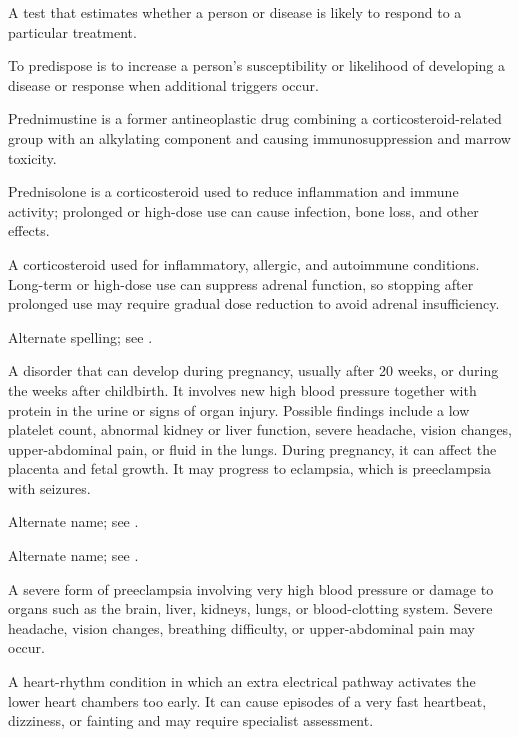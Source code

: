  A test that estimates whether a person or disease is likely to respond to a particular treatment.

 To predispose is to increase a person’s susceptibility or likelihood of developing a disease or response when additional triggers occur.

 Prednimustine is a former antineoplastic drug combining a corticosteroid-related group with an alkylating component and causing immunosuppression and marrow toxicity.

 Prednisolone is a corticosteroid used to reduce inflammation and immune activity; prolonged or high-dose use can cause infection, bone loss, and other effects.

 A corticosteroid used for inflammatory, allergic, and autoimmune conditions. Long-term or high-dose use can suppress adrenal function, so stopping after prolonged use may require gradual dose reduction to avoid adrenal insufficiency.

 Alternate spelling; see .

 A disorder that can develop during pregnancy, usually after 20 weeks, or during the weeks after childbirth. It involves new high blood pressure together with protein in the urine or signs of organ injury. Possible findings include a low platelet count, abnormal kidney or liver function, severe headache, vision changes, upper-abdominal pain, or fluid in the lungs. During pregnancy, it can affect the placenta and fetal growth. It may progress to eclampsia, which is preeclampsia with seizures.


 Alternate name; see .

 Alternate name; see .

 A severe form of preeclampsia involving very high blood pressure or damage to organs such as the brain, liver, kidneys, lungs, or blood-clotting system. Severe headache, vision changes, breathing difficulty, or upper-abdominal pain may occur.

 A heart-rhythm condition in which an extra electrical pathway activates the lower heart chambers too early. It can cause episodes of a very fast heartbeat, dizziness, or fainting and may require specialist assessment.

